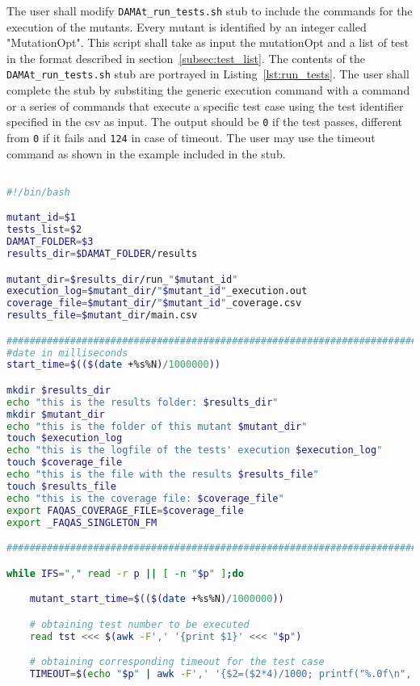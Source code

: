The user shall modify \texttt{DAMAt\_run\_tests.sh} stub to include the commands for the execution of the mutants.
Every mutant is identified by an integer called "MutationOpt".
This script shall take as input the mutationOpt and a list of test in the format described in section~\ref{subsec:test_list}.
The contents of the \texttt{DAMAt\_run\_tests.sh} stub are portrayed in Listing~\ref{lst:run_tests}.
The user shall complete the stub by substiting the generic execution command with a command or a series of commands that execute a specific test case using the test identifier specified in the csv as input.
The output should be \texttt{0} if the test passes, different from \texttt{0} if it fails and \texttt{124} in case of timeout.
The user may use the timeout command as shown in the example included in the stub.

\begin{lstlisting}[label={lst:run_tests},language=bash]

#!/bin/bash

mutant_id=$1
tests_list=$2
DAMAT_FOLDER=$3
results_dir=$DAMAT_FOLDER/results

mutant_dir=$results_dir/run_"$mutant_id"
execution_log=$mutant_dir/"$mutant_id"_execution.out
coverage_file=$mutant_dir/"$mutant_id"_coverage.csv
results_file=$mutant_dir/main.csv

###############################################################################
#date in milliseconds
start_time=$(($(date +%s%N)/1000000))

mkdir $results_dir
echo "this is the results folder: $results_dir"
mkdir $mutant_dir
echo "this is the folder of this mutant $mutant_dir"
touch $execution_log
echo "this is the logfile of the tests' execution $execution_log"
touch $coverage_file
echo "this is the file with the results $results_file"
touch $results_file
echo "this is the coverage file: $coverage_file"
export FAQAS_COVERAGE_FILE=$coverage_file
export _FAQAS_SINGLETON_FM

###############################################################################

while IFS="," read -r p || [ -n "$p" ];do

    mutant_start_time=$(($(date +%s%N)/1000000))

    # obtaining test number to be executed
    read tst <<< $(awk -F',' '{print $1}' <<< "$p")

    # obtaining corresponding timeout for the test case
    TIMEOUT=$(echo "$p" | awk -F',' '{$2=($2*4)/1000; printf("%.0f\n", $2);}')


\end{lstlisting}
